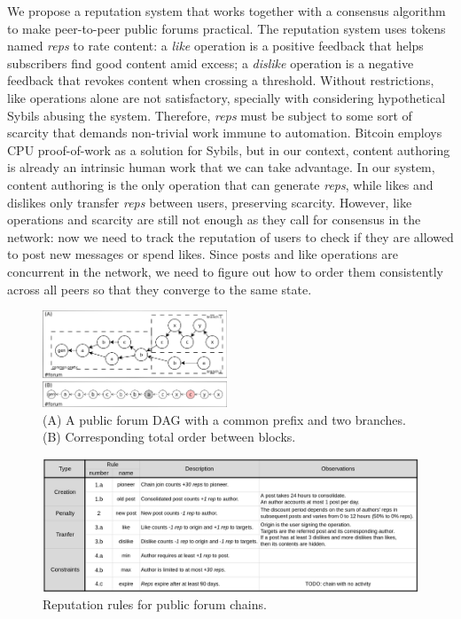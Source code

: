 \documentclass[10pt,journal,compsoc]{IEEEtran}
\newcommand{\reps}     {\emph{reps}\xspace}
\begin{document}
We propose a reputation system that works together with a consensus algorithm
to make peer-to-peer public forums practical.
%
The reputation system uses tokens named \reps to rate content:
a \emph{like} operation is a positive feedback that helps subscribers find good
content amid excess;
a \emph{dislike} operation is a negative feedback that revokes content when
crossing a threshold.
%
Without restrictions, like operations alone are not satisfactory, specially
with considering hypothetical Sybils abusing the system.
Therefore, \reps must be subject to some sort of scarcity that demands
non-trivial work immune to automation.
Bitcoin employs CPU proof-of-work as a solution for Sybils, but in our context,
content authoring is already an intrinsic human work that we can take
advantage.
In our system, content authoring is the only operation that can generate \reps,
while likes and dislikes only transfer \reps between users, preserving
scarcity.
%
However, like operations and scarcity are still not enough as they call for
consensus in the network: now we need to track the reputation of users to check
if they are allowed to post new messages or spend likes.
Since posts and like operations are concurrent in the network, we need to
figure out how to order them consistently across all peers so that they
converge to the same state.

\begin{figure}[t]
\centering
\includegraphics[width=0.49\textwidth]{reps2.png}
\caption{
    (A) A public forum DAG with a common prefix and two branches.
    (B) Corresponding total order between blocks.
}
\label{fig.reps}
\end{figure}

\begin{figure}[ht]
\centering
\includegraphics[width=\textwidth]{rules.png}
\caption{Reputation rules for public forum chains.}
\label{fig.rules}
\end{figure}
\end{document}
